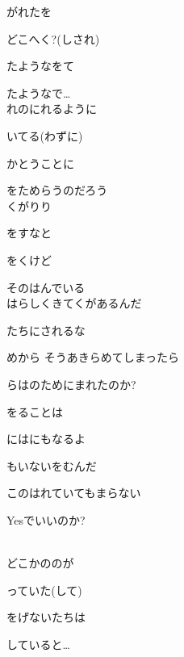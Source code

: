 がれたを

どこへく?(しされ)

たようなをて

たようなで…
\\

れのにれるように

いてる(わずに)

かとうことに

をためらうのだろう
\\

くがりり

をすなと

をくけど

そのはんでいる
\\

はらしくきてくがあるんだ

たちにされるな

めから そうあきらめてしまったら

らはのためにまれたのか?

をることは

にはにもなるよ

もいないをむんだ

このはれていてもまらない

Yesでいいのか?

\\

どこかののが

っていた(して)

をげないたちは

していると…
\\

